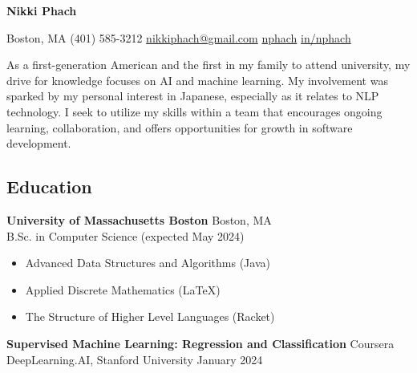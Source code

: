 \documentclass[11pt, letterpaper]{article}
\begin{document}
\begin{center}
    {\huge \textbf{Nikki Phach}}
    \vspace{5mm}
    
    \begin{footnotesize}
    \mbox{} \xdotfill[.5ex]{.4pt} \enspace
    {\color{accent} }
    \enspace Boston, MA \quad\textbar\quad
    {\color{accent} }
    \enspace (401) 585-3212 \quad\textbar\quad
    \href{mailto:nikkiphach@gmail.com}{{\color{accent} } \enspace nikkiphach@gmail.com} \quad\textbar\quad
    \href{https://github.com/nphach}{{\color{accent} } \enspace nphach}
    \quad\textbar\quad
    \href{https://www.linkedin.com/in/nphach/}{{\color{accent} } \enspace in/nphach}
    \enspace \xdotfill[.5ex]{.4pt}
    \end{footnotesize}
    
\end{center}

    \noindent As a first-generation American and the first in my family to attend university, my drive for knowledge focuses on AI and machine learning. My involvement was sparked by my personal interest in Japanese, especially as it relates to NLP technology. I seek to utilize my skills within a team that encourages ongoing learning, collaboration, and offers opportunities for growth in software development.

\vspace{-3mm}
\subsection*{\color{accent} Education \xdotfill[.5ex]{.4pt}}
\textbf{University of Massachusetts Boston} \hfill Boston, MA \\
B.Sc. in Computer Science \hfill (expected May 2024)
\begin{itemize}[noitemsep]
\item Advanced Data Structures and Algorithms (Java)
\item Applied Discrete Mathematics (\LaTeX)
\item The Structure of Higher Level Languages (Racket)
\end{itemize}
\textbf{Supervised Machine Learning: Regression and Classification} \hfill Coursera \\
DeepLearning.AI, Stanford University \hfill January 2024

\vspace{-3mm}
\end{document}
